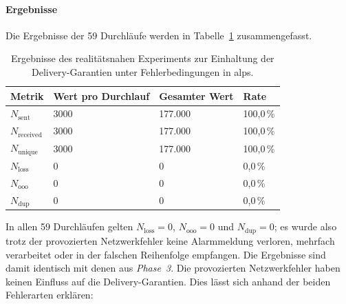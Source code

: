 \paragraph{Ergebnisse} Die Ergebnisse der 59 Durchläufe werden in Tabelle~\ref{tab:exp-alps-realistic-results} zusammengefasst.

\begin{table}[H]
    \centering
    \caption{Ergebnisse des realitätsnahen Experiments zur Einhaltung der Delivery-Ga\-ran\-ti\-en unter Fehlerbedingungen in \acrshort{alps}.}
    \label{tab:exp-alps-realistic-results}
    \begin{tabular}{|l|l|l|l|}
        \hline
        \textbf{Metrik}       & \textbf{Wert pro Durchlauf} & \textbf{Gesamter Wert} & \textbf{Rate} \\
        \hline
        $N_{\text{sent}}$     & 3000                        & 177.000                & 100{,}0\,\%   \\
        $N_{\text{received}}$ & 3000                        & 177.000                & 100{,}0\,\%   \\
        $N_{\text{unique}}$   & 3000                        & 177.000                & 100{,}0\,\%   \\
        $N_{\text{loss}}$     & 0                           & 0                      & 0{,}0\,\%     \\
        $N_{\text{ooo}}$      & 0                           & 0                      & 0{,}0\,\%     \\
        $N_{\text{dup}}$      & 0                           & 0                      & 0{,}0\,\%     \\
        \hline
    \end{tabular}
\end{table}

In allen 59 Durchläufen gelten $N_{\text{loss}} = 0$, $N_{\text{ooo}} = 0$ und $N_{\text{dup}} = 0$; es wurde also trotz der provozierten Netzwerkfehler keine Alarmmeldung verloren, mehrfach verarbeitet oder in der falschen Reihenfolge empfangen. Die Ergebnisse sind damit identisch mit denen aus \textit{Phase~3}. Die provozierten Netzwerkfehler haben keinen Einfluss auf die Delivery-Garantien. Dies lässt sich anhand der beiden Fehlerarten erklären:


